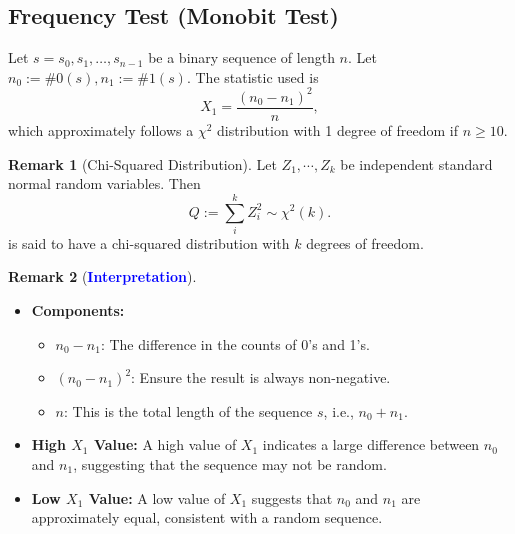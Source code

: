 \documentclass[12pt,openany]{book}
\theoremstyle{definition}
\newtheorem{remark}{Remark}[chapter]
\newcommand{\ie}{\textnormal{i.e.}}
\begin{document}
\subsection{Frequency Test (Monobit Test)}
\begin{tcolorbox}[colback=white,colframe=lemcolor,arc=5pt,title={\color{white}\bf Monobit Test}]
Let \( s = s_0, s_1, \ldots, s_{n-1} \) be a binary sequence of length \( n \).
Let \( n_0:=\#0(s), n_1:=\#1(s) \). The statistic used is
\[ X_1 = \frac{(n_0 - n_1)^2}{n}, \]
which approximately follows a \( \chi^2 \) distribution with 1 degree of freedom if \( n \geq 10 \).
\end{tcolorbox}
\begin{remark}[Chi-Squared Distribution]
	Let $Z_1,\cdots,Z_k$ be independent standard normal random variables. Then \[
	Q:=\sum_{i}^kZ_i^2\sim\chi^2(k).
	\] is said to have a chi-squared distribution with $k$ degrees of freedom.
	\begin{center}
	\end{center}
\end{remark}
\begin{remark}[\textcolor{blue}{\bf Interpretation}]
	\ \begin{itemize}
		\item \textbf{Components:} \begin{itemize}
			\item $n_0-n_1$: The difference in the counts of 0's and 1's.
			\item $(n_0-n_1)^2$: Ensure the result is always non-negative.
			\item $n$: This is the total length of the sequence $s$, \ie, $n_0+n_1$.
		\end{itemize} 
		\item \textbf{High $X_1$ Value:} A high value of $X_1$ indicates a large difference between $n_0$ and $n_1$,
		suggesting that the sequence may not be random.
		\item \textbf{Low $X_1$ Value:} A low value of $X_1$ suggests that $n_0$ and $n_1$
		are approximately equal, consistent with a random sequence.
	\end{itemize}
\end{remark}
\end{document}
